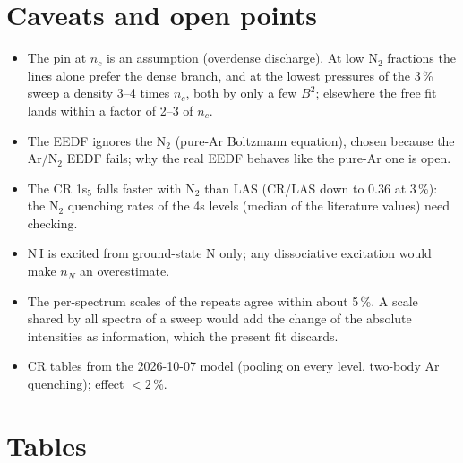 \documentclass[11pt]{article}
\newcommand{\nc}{n_c}
\begin{document}
\section{Caveats and open points}
\begin{itemize}
\item The pin at $\nc$ is an assumption (overdense discharge). At low N$_2$ fractions the lines alone prefer the dense branch, and at the lowest
  pressures of the 3\,\% sweep a density 3--4 times $\nc$, both by only a few $B^2$; elsewhere the free fit
  lands within a factor of 2--3 of $\nc$.
\item The EEDF ignores the N$_2$ (pure-Ar Boltzmann equation), chosen because the Ar/N$_2$ EEDF fails; why the real
  EEDF behaves like the pure-Ar one is open.
\item The CR 1s$_5$ falls faster with N$_2$ than LAS (CR/LAS down to 0.36 at 3\,\%): the N$_2$ quenching rates of
  the 4s levels (median of the literature values) need checking.
\item N\,I is excited from ground-state N only; any dissociative excitation would make $n_N$ an overestimate.
\item The per-spectrum scales of the repeats agree within about 5\,\%. A scale shared by all spectra of a sweep would
  add the change of the absolute intensities as information, which the present fit discards.
\item CR tables from the 2026-10-07 model (pooling on every level, two-body Ar quenching); effect $<2\,\%$.
\end{itemize}

\appendix
\section{Tables}
\small



\end{document}
